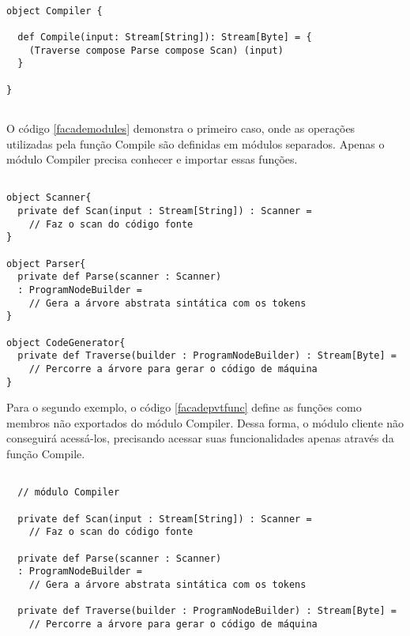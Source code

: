 \begin{lstlisting}[caption={Função de acesso Compile},label=facadecompile]
    
object Compiler {

  def Compile(input: Stream[String]): Stream[Byte] = {
    (Traverse compose Parse compose Scan) (input)
  }
  
}
    
\end{lstlisting}

O código \ref{facademodules} demonstra o primeiro caso, 
onde as operações utilizadas pela função Compile são 
definidas em módulos separados. Apenas o módulo 
Compiler precisa conhecer e importar essas funções.

\begin{lstlisting}[caption={Função de acesso Compile},label=facademodules]
    
object Scanner{
  private def Scan(input : Stream[String]) : Scanner = 
    // Faz o scan do código fonte
}

object Parser{
  private def Parse(scanner : Scanner)
  : ProgramNodeBuilder = 
    // Gera a árvore abstrata sintática com os tokens
}

object CodeGenerator{
  private def Traverse(builder : ProgramNodeBuilder) : Stream[Byte] = 
    // Percorre a árvore para gerar o código de máquina
}

\end{lstlisting}

Para o segundo exemplo, o código \ref{facadepvtfunc} define 
as funções como membros não exportados do módulo Compiler. 
Dessa forma, o módulo cliente não conseguirá acessá-los, 
precisando acessar suas funcionalidades apenas através da 
função Compile.

\begin{lstlisting}[caption={Função de acesso Compile},label=facadepvtfunc]
    
  // módulo Compiler    

  private def Scan(input : Stream[String]) : Scanner = 
    // Faz o scan do código fonte

  private def Parse(scanner : Scanner)
  : ProgramNodeBuilder = 
    // Gera a árvore abstrata sintática com os tokens

  private def Traverse(builder : ProgramNodeBuilder) : Stream[Byte] = 
    // Percorre a árvore para gerar o código de máquina
    
\end{lstlisting}

\begin{comment}
\subsection*{Vantagens e Desvantanges}

A implementação funcional desse padrão não apresenta 
vantagens ou desvantagens, tendo em vista que ela apenas 
depende da forma como a linguagem separa ou agrupa 
suas implementações - seja através de classes ou módulos. 
\end{comment}